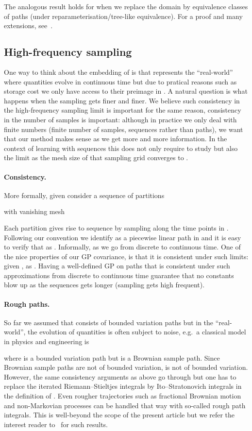 \documentclass{article}
\begin{document}
The analogous result holds for  when we replace the domain  by equivalence classes of paths (under reparameterisation/tree-like equivalence). 
For a proof and many extensions, see~\cite{ChevyrevOberhauser18}.
\subsection{High-frequency sampling} 
One way to think about the embedding of  is that  represents the ``real-world'' where quantities evolve in continuous time but due to pratical reasons such as storage cost we only have access to their preimage in . 
A natural question is what happens when the sampling gets finer and finer. 
We believe such consistency in the high-frequency sampling limit is important for the same reason, consistency in the number of samples  is important: although in practice we only deal with finite numbers (finite number of samples, sequences rather than paths), we want that our method makes sense as we get more and more information.
In the context of learning with sequences this does not only require to study  but also the limit as the mesh size of that sampling grid converges to . 

\paragraph{Consistency.}More formally, given  consider a sequence  of partitions

with vanishing mesh

Each partition  gives rise to sequence  by sampling  along the time points in .
Following our convention we identify  as a piecewise linear path in  and it is easy to verify that  as .
Informally, as  we go from discrete to continuous time. 
One of the nice properties of our GP covariance, is that it is consistent under such limits: given ,  as . 
Having a well-defined GP on paths that is consistent under such approximations from discrete to continuous time guarantee that no constants blow up as the sequences gets longer (sampling gets high frequent). 

\paragraph{Rough paths.}
So far we assumed that  consists of bounded variation paths but in the ``real-world'', the evolution of quantities is often subject to noise, e.g.~a classical model in physics and engineering is

where  is a bounded variation path but  is a Brownian sample path.
Since Brownian sample paths are not of bounded variation,  is not of bounded variation.
However, the same consistency arguments as above go through but one has to replace the iterated Riemann--Stieltjes integrals by Ito--Stratonovich integrals in the definition of .
Even rougher trajectories such as fractional Brownian motion and non-Markovian processes can be handled that way with so-called rough path integrals.
This is well-beyond the scope of the present article but we refer the interest reader to~\cite{ChevyrevOberhauser18} for such results. 
\end{document}
